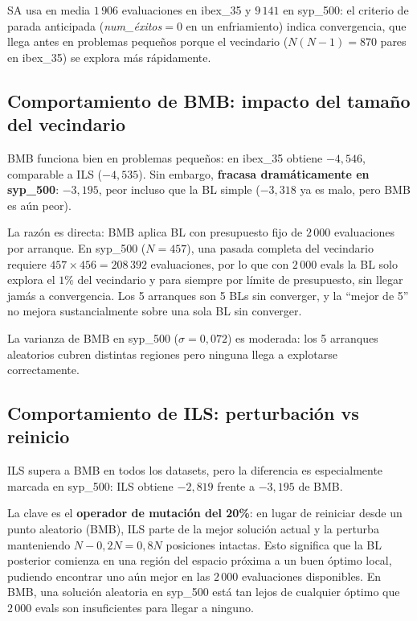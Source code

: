 \documentclass[12pt,a4paper]{article}
\begin{document}
SA usa en media $1\,906$ evaluaciones en ibex\_35 y $9\,141$ en syp\_500: el criterio de
parada anticipada (\textit{num\_éxitos}$=0$ en un enfriamiento) indica convergencia, que
llega antes en problemas pequeños porque el vecindario ($N(N-1)=870$ pares en ibex\_35)
se explora más rápidamente.

\subsection{Comportamiento de BMB: impacto del tamaño del vecindario}

BMB funciona bien en problemas pequeños: en ibex\_35 obtiene $-4{,}546$, comparable a
ILS ($-4{,}535$). Sin embargo, \textbf{fracasa dramáticamente en syp\_500}: $-3{,}195$,
peor incluso que la BL simple ($-3{,}318$ ya es malo, pero BMB es aún peor).

La razón es directa: BMB aplica BL con presupuesto fijo de $2\,000$ evaluaciones por
arranque. En syp\_500 ($N=457$), una pasada completa del vecindario requiere
$457 \times 456 = 208\,392$ evaluaciones, por lo que con $2\,000$ evals la BL solo explora
el $1\%$ del vecindario y para siempre por límite de presupuesto, sin llegar jamás a
convergencia. Los 5 arranques son 5 BLs sin converger, y la ``mejor de 5'' no mejora
sustancialmente sobre una sola BL sin converger.

La varianza de BMB en syp\_500 ($\sigma=0{,}072$) es moderada: los 5 arranques aleatorios
cubren distintas regiones pero ninguna llega a explotarse correctamente.

\subsection{Comportamiento de ILS: perturbación vs reinicio}

ILS supera a BMB en todos los datasets, pero la diferencia es especialmente marcada en
syp\_500: ILS obtiene $-2{,}819$ frente a $-3{,}195$ de BMB.

La clave es el \textbf{operador de mutación del 20\%}: en lugar de reiniciar desde un
punto aleatorio (BMB), ILS parte de la mejor solución actual y la perturba manteniendo
$N - 0{,}2N = 0{,}8N$ posiciones intactas. Esto significa que la BL posterior comienza
en una región del espacio próxima a un buen óptimo local, pudiendo encontrar uno aún
mejor en las $2\,000$ evaluaciones disponibles. En BMB, una solución aleatoria en
syp\_500 está tan lejos de cualquier óptimo que $2\,000$ evals son insuficientes para
llegar a ninguno.
\end{document}

